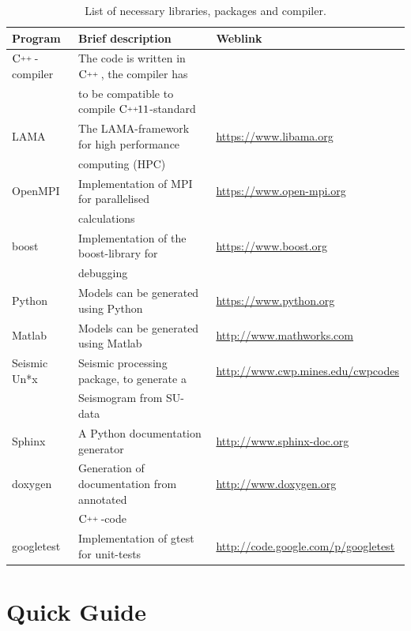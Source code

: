 \documentclass[pdftex,a4paper,parskip,listof=totoc,bibliography=totoc,onehalfspacing,12pt]{scrreprt}
\newcommand{\CC}[1][]{$\text{C\hspace{0ex}}^{_{_{_{++}}}}					%
                      \ifthenelse{\equal{#1}{}}{}{\text{\hspace{-.625ex}#1}}$}
\begin{document}
\begin{table}[h!]
\caption{List of necessary libraries, packages and compiler.}\label{tab:pack}
\centering
\begin{adjustbox}{width=1\textwidth,center=\textwidth}
	\begin{tabular}{lll}
	\toprule
	Program & Brief description & Weblink \\
	\midrule
	\CC-compiler	& The code is written in \CC[], the compiler	has 		& \\
										& to be compatible to compile \CC[11]-standard					& \\
LAMA 				& The LAMA-framework for high performance			& \url{https://www.libama.org} \\
	& computing 	(HPC)							    & \\
	\midrule
	OpenMPI			& Implementation of MPI for parallelised  			& \url{https://www.open-mpi.org} \\
										& calculations						& \\
		boost					& Implementation of the boost-library	for  				& \url{https://www.boost.org}		\\
										& debugging																& \\										
	Python				& Models can be generated using Python 		& \url{https://www.python.org}\\
	Matlab				& Models can be generated using Matlab		& \url{http://www.mathworks.com}\\										
	
	
	Seismic Un*x	& 	Seismic processing package, to generate a  	& \url{http://www.cwp.mines.edu/cwpcodes}\\ 
											&  Seismogram from SU-data  															& \\
	
	
	Sphinx				& 	A Python documentation generator 							& \url{http://www.sphinx-doc.org}\\
	doxygen			& 	Generation of documentation from annotated				& \url{http://www.doxygen.org}\\
										& \CC-code 															& \\
	googletest & Implementation of gtest for unit-tests & \url{http://code.google.com/p/googletest}\\
	\bottomrule
	\end{tabular}
	\end{adjustbox}
\end{table}

\section{Quick Guide}
\end{document}
